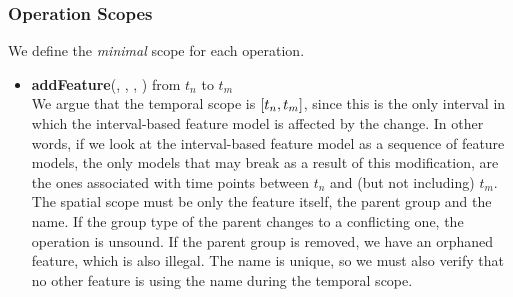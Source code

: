 \subsubsection*{Operation Scopes}
We define the \textit{minimal} scope for each operation.
\begin{itemize}

  \item \textbf{addFeature}(, , , ) from $t_n$ to $t_m$\\
     We argue that the temporal scope is $\interval{t_n}{t_m}$, since this is the only interval in which the interval-based feature model is affected by the change. In other words, if we look at the interval-based feature model as a sequence of feature models, the only models that may break as a result of this modification, are the ones associated with time points between $t_n$ and (but not including) $t_m$. The spatial scope must be only the feature itself, the parent group and the name. If the group type of the parent changes to a conflicting one, the operation is unsound. If the parent group is removed, we have an orphaned feature, which is also illegal. The name is unique, so we must also verify that no other feature is using the name during the temporal scope. 
 


\end{itemize}

